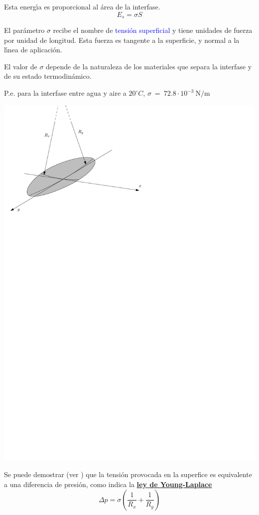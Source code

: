Esta energ\'{\i}a es proporcional al \'area de la interfase.
\begin{equation}
	 E_s = \sigma S
\end{equation} 

El par\'ametro $\sigma$ recibe el nombre de \textcolor{blue}{tensi\'on superficial} y tiene unidades de fuerza por
unidad de longitud. Esta fuerza es tangente a la superficie, y normal a la l\'{\i}nea de aplicaci\'on.

El valor de $\sigma$ depende de la naturaleza de los materiales que separa la interfase y de su estado termodin\'amico.

P.e. para la interfase entre agua y aire a $20^\circ C$, $\sigma~=~72.8\cdot10^{-3}~\text{N/m}$


\begin{center}
\includegraphics{TeX_files/chapter01-Introduccion/YoungLaplace}
\end{center}
Se puede demostrar (ver \cite{Batchelor1997}) que la tensi\'on provocada en la superfice es equivalente a una diferencia
de presi\'on, como indica la \href{https://es.wikipedia.org/wiki/Ley_de_Laplace}{\textbf{ley de Young-Laplace}}
\begin{equation}
	\Delta p = \sigma\left(\frac{1}{R_x}+\frac{1}{R_y}\right)
\end{equation}


